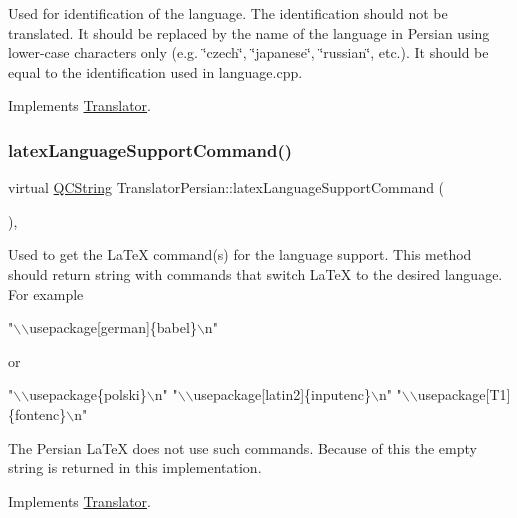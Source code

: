 Used for identification of the language. The identification should not be translated. It should be replaced by the name of the language in Persian using lower-\/case characters only (e.\+g. \char`\"{}czech\char`\"{}, \char`\"{}japanese\char`\"{}, \char`\"{}russian\char`\"{}, etc.). It should be equal to the identification used in language.\+cpp. 

Implements \mbox{\hyperlink{class_translator}{Translator}}.

\mbox{\label{class_translator_persian_a486405a083d1d832118bf698ff7b4925}} 
\subsubsection{\texorpdfstring{latexLanguageSupportCommand()}{latexLanguageSupportCommand()}}
{\footnotesize\ttfamily virtual \mbox{\hyperlink{class_q_c_string}{Q\+C\+String}} Translator\+Persian\+::latex\+Language\+Support\+Command (\begin{DoxyParamCaption}{ }\end{DoxyParamCaption})\hspace{0.3cm}{\ttfamily [inline]}, {\ttfamily [virtual]}}

Used to get the La\+TeX command(s) for the language support. This method should return string with commands that switch La\+TeX to the desired language. For example 
\begin{DoxyPre}"\(\backslash\)\(\backslash\)usepackage[german]\{babel\}\(\backslash\)n"
 \end{DoxyPre}
 or 
\begin{DoxyPre}"\(\backslash\)\(\backslash\)usepackage\{polski\}\(\backslash\)n"
 "\(\backslash\)\(\backslash\)usepackage[latin2]\{inputenc\}\(\backslash\)n"
 "\(\backslash\)\(\backslash\)usepackage[T1]\{fontenc\}\(\backslash\)n"
 \end{DoxyPre}


The Persian La\+TeX does not use such commands. Because of this the empty string is returned in this implementation. 

Implements \mbox{\hyperlink{class_translator}{Translator}}.

\mbox{\label{class_translator_persian_ae3b273833467e4dfb2144066efaaca1d}} 
